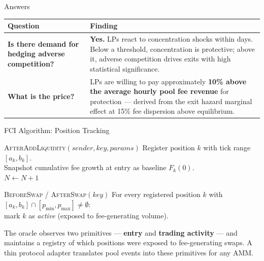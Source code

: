 \documentclass[aspectratio=169]{beamer}
\newcommand{\PosCount}{N}
\begin{document}
\begin{frame}{Answers}

\begin{center}
\renewcommand{\arraystretch}{1.8}
\begin{tabular}{@{}>{\bfseries}p{4.5cm} p{8cm}@{}}
\toprule
Question & Finding \\
\midrule
Is there demand for hedging adverse competition?
  & \textbf{Yes.} LPs react to concentration shocks within days. Below
    a threshold, concentration is protective; above it, adverse competition
    drives exits with high statistical significance. \\

What is the price?
  & LPs are willing to pay approximately \textbf{10\% above the average
    hourly pool fee revenue} for protection --- derived from the exit
    hazard marginal effect at 15\% fee dispersion above equilibrium. \\

\bottomrule
\end{tabular}
\end{center}

\end{frame}

\begin{frame}{FCI Algorithm: Position Tracking}

\begin{block}{\textsc{AfterAddLiquidity}$(sender, key, params)$}
\small
Register position $k$ with tick range $[a_k, b_k]$. \\[2pt]
Snapshot cumulative fee growth at entry as baseline $F_k(0)$. \\[2pt]
$\PosCount \gets \PosCount + 1$
\end{block}

\begin{block}{\textsc{BeforeSwap / AfterSwap}$(key)$}
\small
For every registered position $k$ with $[a_k, b_k] \cap [p_{\min}, p_{\max}] \neq \emptyset$: \\[2pt]
\quad mark $k$ as \emph{active} (exposed to fee-generating volume).
\end{block}

\medskip

{\footnotesize
The oracle observes two primitives --- \textbf{entry} and \textbf{trading activity} ---
and maintains a registry of which positions were exposed to fee-generating swaps.
A thin protocol adapter translates pool events into these primitives for any AMM.}

\end{frame}
\end{document}
